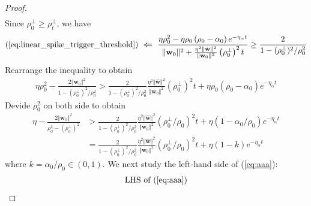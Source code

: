 \documentclass[pdflatex,sn-basic]{sn-jnl}%
\theoremstyle{thmstyleone}%
\begin{document}
\begin{appendices}
\begin{proof}
\begin{equation}
\begin{aligned}
  \end{aligned}
  \end{equation}
  Since $\rho_0^{\perp} \ge \rho_{t}^{\perp}$, we have 
  \begin{equation}\label{suff_1}
  \begin{aligned}
    (\ref{eq:linear_spike_trigger_threshold}) 
    \ \boldsymbol{\Leftarrow} \ 
    \frac{\eta \rho_0^2 - \eta \rho_0 \left(\rho_0 -\alpha_{0}\right) e^{-\eta_{\alpha}t}}
    {\Vert \mathbf{w}_0 \Vert^{2} + 
    \frac{\eta^{2} \Vert \hat{\mathbf{w}} \Vert^2 }{\Vert \mathbf{w}_0 \Vert^2} \left(\rho_{0}^{\perp}\right)^2 t} \ge \frac{2}{1 - (\rho_0^{\perp})^2/\rho_0^2}
  \end{aligned}
  \end{equation}
  Rearrange the inequality to obtain
  \begin{equation*}
  \begin{aligned}
    \eta \rho_0^2 
    -
    \frac{2 \Vert \mathbf{w}_0 \Vert^{2}}{1 - (\rho_0^{\perp})^2/\rho_0^2}
      >
    \frac{2}{1 - (\rho_0^{\perp})^2/\rho_0^2}
    \frac{\eta^{2} \Vert \hat{\mathbf{w}} \Vert^2 }{\Vert \mathbf{w}_0 \Vert^2} \left(\rho_{0}^{\perp}\right)^2 t
    +
    \eta \rho_0 \left(\rho_0 -\alpha_{0}\right) e^{-\eta_{\alpha}t} 
  \end{aligned}
  \end{equation*}
  Devide $\rho_0^2$ on both side to obtain
  \begin{equation}\label{eq:aaa}
  \begin{aligned}
    \eta 
    -
    \frac{2 \Vert \mathbf{w}_0 \Vert^{2}}{\rho_0^2 - (\rho_0^{\perp})^2}
    &  >
    \frac{2}{1 - (\rho_0^{\perp})^2/\rho_0^2}
    \frac{\eta^{2} \Vert \hat{\mathbf{w}} \Vert^2 }{\Vert \mathbf{w}_0 \Vert^2} \left(\rho_{0}^{\perp} / \rho_0\right)^2 t
    +
    \eta \left( 1 - \alpha_0/\rho_0 \right) e^{-\eta_{\alpha}t} 
    \\ & =
    \frac{2}{1 - (\rho_0^{\perp})^2/\rho_0^2}
    \frac{\eta^{2} \Vert \hat{\mathbf{w}} \Vert^2 }{\Vert \mathbf{w}_0 \Vert^2} \left(\rho_{0}^{\perp} / \rho_0\right)^2 t
    +
    \eta \left( 1 - k \right) e^{-\eta_{\alpha}t}
  \end{aligned}
  \end{equation}
  where $k = \alpha_0 / \rho_0 \in (0, 1)$.
  We next study the left-hand side of (\ref{eq:aaa}):
  \begin{equation}\label{eq:lhs_bbb}
  \begin{aligned}
    \text{LHS of }(\ref{eq:aaa})

\end{aligned}
\end{equation}
\end{proof}
\end{appendices}
\end{document}
